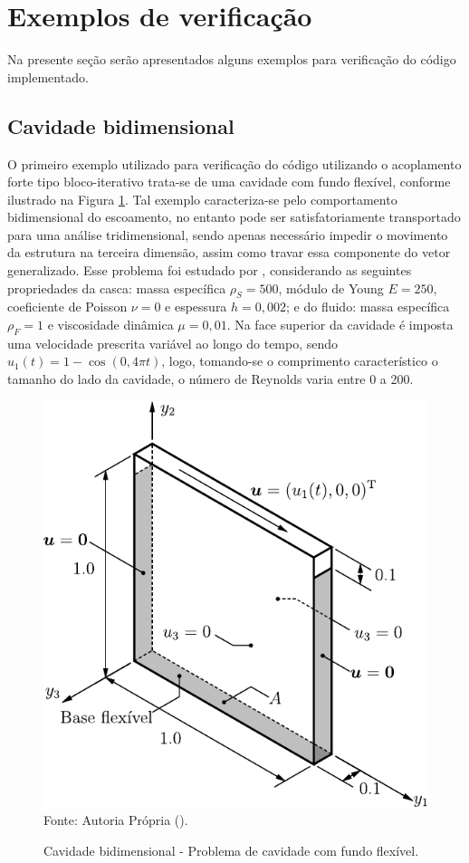 \section{Exemplos de verificação}

Na presente seção serão apresentados alguns exemplos para verificação do código implementado.

\subsection{Cavidade bidimensional}

O primeiro exemplo utilizado para verificação do código utilizando o acoplamento forte tipo bloco-iterativo trata-se de uma cavidade com fundo flexível, conforme ilustrado na Figura \ref{fig:cavity2D}. Tal exemplo caracteriza-se pelo comportamento bidimensional do escoamento, no entanto pode ser satisfatoriamente transportado para uma análise tridimensional, sendo apenas necessário impedir o movimento da estrutura na terceira dimensão, assim como travar essa componente do vetor generalizado. Esse problema foi estudado por , considerando as seguintes propriedades da casca: massa específica $\rho_S=500$, módulo de Young $E=250$, coeficiente de Poisson $\nu=0$ e espessura $h=0,002$; e do fluido: massa específica $\rho_F=1$ e viscosidade dinâmica $\mu=0,01$. Na face superior da cavidade é imposta uma velocidade prescrita variável ao longo do tempo, sendo $u_1(t)=1-\cos{(0,4\pi t)}$, logo, tomando-se o comprimento característico o tamanho do lado da cavidade, o número de Reynolds varia entre 0 a 200.

\begin{figure}[h!]
    \centering
    \caption{Cavidade bidimensional - Problema de cavidade com fundo flexível.}
    \includegraphics[width=0.5\linewidth]{Figuras/FSI-Cavity2D/FSI-Cavity2D.pdf}
    \\Fonte: Autoria Própria (\the\year).
    \label{fig:cavity2D}
\end{figure}

